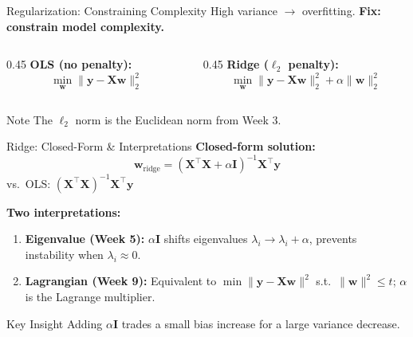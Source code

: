 \documentclass[aspectratio=169, 10pt]{beamer}
\begin{document}
\begin{frame}{Regularization: Constraining Complexity}
  High variance $\rightarrow$ overfitting.
  \textbf{Fix: constrain model complexity.}

  \vspace{1em}
  \begin{columns}[T]
    \begin{column}{0.45\textwidth}
      \textbf{OLS (no penalty):}
      \[
        \min_{\mathbf{w}} \|\mathbf{y} - \mathbf{Xw}\|_2^2
      \]
    \end{column}
    \begin{column}{0.45\textwidth}
      \textbf{Ridge ($\ell_2$ penalty):}
      \[
        \min_{\mathbf{w}} \|\mathbf{y} - \mathbf{Xw}\|_2^2 + \alpha\|\mathbf{w}\|_2^2
      \]
    \end{column}
  \end{columns}

  \vfill
  \begin{block}{Note}
    The $\ell_2$ norm is the Euclidean norm from Week 3.
  \end{block}
\end{frame}

\begin{frame}{Ridge: Closed-Form \& Interpretations}
  \textbf{Closed-form solution:}
  \[
    \mathbf{w}_{\text{ridge}} = (\mathbf{X}^\top\mathbf{X} + \alpha\mathbf{I})^{-1}\mathbf{X}^\top\mathbf{y}
  \]
  vs.\ OLS: $(\mathbf{X}^\top\mathbf{X})^{-1}\mathbf{X}^\top\mathbf{y}$

  \vspace{0.8em}
  \textbf{Two interpretations:}
  \begin{enumerate}
    \item \textbf{Eigenvalue (Week 5):}
      $\alpha\mathbf{I}$ shifts eigenvalues $\lambda_i \to \lambda_i + \alpha$, prevents instability when $\lambda_i \approx 0$.

    \item \textbf{Lagrangian (Week 9):}
      Equivalent to $\min \|\mathbf{y}-\mathbf{Xw}\|^2$ s.t.\ $\|\mathbf{w}\|^2 \leq t$;
      $\alpha$ is the Lagrange multiplier.
  \end{enumerate}

  \vfill
  \begin{block}{Key Insight}
    Adding $\alpha\mathbf{I}$ trades a small bias increase for a large variance decrease.
  \end{block}
\end{frame}
\end{document}
